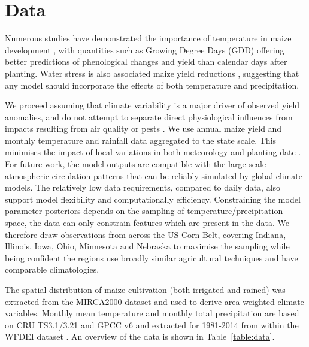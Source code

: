 \documentclass[12pt]{article}
\begin{document}
\section{Data}
\label{sec:data}

Numerous studies have demonstrated the importance of temperature in maize development \citep[e.g.][]{cross:1972, coelho:1980, daughtry:1984, cutforth:1990, bonhomme:1994}, with quantities such as Growing Degree Days (GDD) offering better predictions of phenological changes and yield than calendar days after planting. Water stress is also associated maize yield reductions \citep[e.g.][and references therein]{cakir:2004, ge:2012, lobell:2013, carter:2016, song:2019}, suggesting that any model should incorporate the effects of both temperature and precipitation.

We proceed assuming that climate variability is a major driver of observed yield anomalies, and do not attempt to separate direct physiological influences from impacts resulting from air quality or pests \citep{Gornall:2010}. We use annual maize yield and monthly temperature and rainfall data aggregated to the state scale. This minimises the impact of local variations in both meteorology and planting date \citep[e.g.][]{schlenker:2009, lobell:2010}. For future work, the model outputs are compatible with the large-scale atmospheric circulation patterns that can be reliably simulated by global climate models. The relatively low data requirements, compared to daily data, also support model flexibility and computationally efficiency. Constraining the model parameter posteriors depends on the sampling of temperature/precipitation space, the data can only constrain features which are present in the data. We therefore draw observations from across the US Corn Belt, covering Indiana, Illinois, Iowa, Ohio, Minnesota and Nebraska to maximise the sampling while being confident the regions use broadly similar agricultural techniques and have comparable climatologies.

The spatial distribution of maize cultivation (both irrigated and rained) was extracted from the MIRCA2000 dataset \citep{Portmann:2010} and used to derive area-weighted climate variables. Monthly mean temperature and monthly total precipitation are based on CRU TS3.1/3.21 \citep{Harris:2014} and GPCC v6 \citep{Schneider:2014} and extracted for 1981-2014 from within the WFDEI dataset \citep{Weedon:2014}. An overview of the data is shown in Table~\ref{table:data}. 
\end{document}
